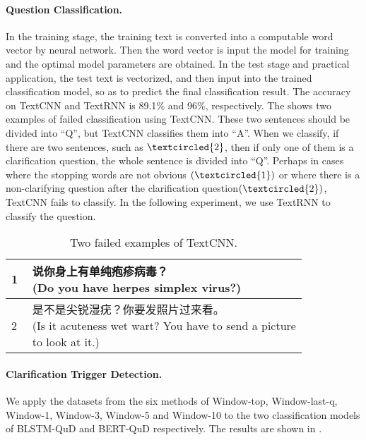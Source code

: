 \paragraph{Question Classification.} 
In the training stage, the training text is converted into a computable word vector by neural network. Then the word vector is input the model for training and the optimal model parameters are obtained. In the test stage and practical application, the test text is vectorized, and then input into the trained classification model, so as to predict the final classification result. The accuracy on TextCNN and TextRNN is 89.1$\%$ and 96$\%$, respectively. The  shows two examples of failed classification using TextCNN. These two sentences should be divided into ``Q'', but TextCNN classifies them into ``A''. When we classify, if there are two sentences, such as $\textcircled{2}$, then if only one of them is a clarification question, the whole sentence is divided into ``Q''.
Perhaps in cases where the stopping words are not obvious $\left( \textcircled{1} \right)$ or where there is a non-clarifying question after the clarification question$\left( \textcircled{2} \right)$, TextCNN fails to classify. In the following experiment, we use TextRNN to classify the question.

\begin{CJK}{UTF8}{gbsn}
\begin{table}
\small
\begin{tabular}[t]{p{0.5cm}p{6.5cm}}
\toprule
\textcircled{1}&\makecell[l]{说你身上有单纯疱疹病毒？\\(Do you have herpes simplex virus?)}\\
\hline
\textcircled{2}&\makecell[l]{是不是尖锐湿疣？你要发照片过来看。\\(Is it acuteness wet wart? You have to send a picture\\ to look at it.)}\\
\bottomrule
\end{tabular}
\caption{Two failed examples of TextCNN.}
\label{tab:example4}
\end{table}
\end{CJK}

\paragraph{Clarification Trigger Detection.}
We apply the datasets from the six methods of Window-top, Window-last-q, Window-1, Window-3, Window-5 and Window-10 to the two classification models of BLSTM-QuD and BERT-QuD respectively. The results are shown in  .

